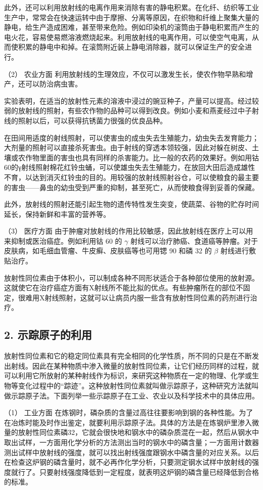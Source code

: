 此外，还可以利用放射线的电离作用来消除有害的静电积累。在化纤、纺织等工业生产中，常常会在快速运转中由于摩擦、分离等原因，在织物和纤维上聚集大量的静电，给生产造成困难，甚至带来危险。例如印染机的滚筒由于静电积累而产生的电火花，容易使易燃溶液燃烧起来。利用放射线的电离作用，可以使空气电离，从而使积累的静电中和掉。在滚筒附近装上静电消除器，就可以保证生产的安全进行。

（2） 农业方面
利用放射线的生理效应，不仅可以激发生长，使农作物早熟和增产，还可以防治病虫害。

实验表明，在适当的放射性元素的溶液中浸过的豌豆种子，产量可以提高。经过较弱的放射线的照射，有些农作物的品种可以得到改良。例如小麦和燕麦经过中子射线的照射以后，可以获得抗锈菌力很强的优良品种。

在田间用适度的射线照射，可以使害虫的成虫失去生殖能力，幼虫失去发育能力；大剂量的照射可以直接杀死害虫。由于射线的穿透本领较强，因此对躲在树皮、土壤或农作物里面的害虫也具有同样的杀害能力。比一般的农药的效果好。例如用钴60的γ射线照射棉花红铃虫蛹，可以使雄虫失去生殖能力，在放回大田后造成雄性不育，以达到消灭红铃虫的目的。用较强的放射线照射谷仓，可以使粮食的最主要的害虫------鼻虫的幼虫受到严重的抑制，甚至死亡，从而使粮食得到妥善的保藏。

此外，放射线的照射还能引起生物的遗传特性发生突变，使蔬菜、谷物的贮存时间延长，保持新鲜和丰富的营养等。

（3） 医疗方面
由于肿瘤对放射线的作用比较敏感，因此放射线在医疗上可以用来抑制或医治癌症。例如利用钴
60 的 \(\gamma\)
射线可以治疗肺癌、食道癌等肿瘤。对于皮肤病，如毛细血管瘤、牛皮癣、皮肤癌等也可用锶
90 和磷 32 的 \(\beta\) 射线进行敷贴治疗。

放射性同位素由于体积小，可以制成各种不同形状适合于各种部位使用的放射源。这就使它在治疗癌症方面有X射线所不能比拟的优点。有些肿瘤所在的部位不固定，很难用X射线照射，这就可以让病员内服一些含有放射性同位素的药剂进行治疗。

\subsection{2.
示踪原子的利用}

放射性同位素和它的稳定同位素具有完全相同的化学性质，所不同的只是在不断发出射线。因此在某种物质中渗入微量的放射性同位素，让它们经历同样的过程，就可以利用它所放射的某种射线作为标识，来研究这种物质在一定的物理、化学或生物等变化过程中的``踪迹''。这种放射性同位素就叫做示踪原子，这种研究方法就叫做示踪原子法。下面列举一些示踪原子在工业、农业以及科学技术中的具体应用。

（1） 工业方面
在炼钢时，磷杂质的含量过高往往要影响到钢的各种性能。为了在冶炼时能及时作出鉴定，就要利用示踪原子法。具体的方法是在炼钢炉里渗入微量的放射性同位素磷32，它就会很快地和钢水中的磷杂质混在一起，然后从钢水中取出试样，一方面用化学分析的方法测出当时的钢水中的磷含量；一方面用计数器测出试样中放射线的强度，就可以找出射线强度跟钢水中磷含量的对应关系。以后在检查这炉钢的磷含量时，就不必再作化学分析，只要测定钢水试样中放射线的强度就行了。只要射线强度降低到一定程度，就表明这炉钢的磷含量已经降低到合格的标准。

